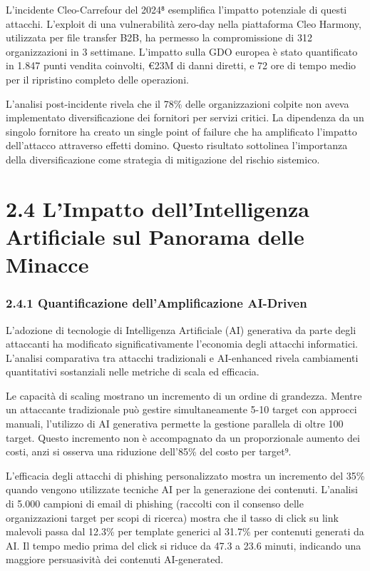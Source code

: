 \documentclass{report}
\begin{document}
L'incidente Cleo-Carrefour del 2024⁸ esemplifica l'impatto potenziale di
questi attacchi. L'exploit di una vulnerabilità zero-day nella
piattaforma Cleo Harmony, utilizzata per file transfer B2B, ha permesso
la compromissione di 312 organizzazioni in 3 settimane. L'impatto sulla
GDO europea è stato quantificato in 1.847 punti vendita coinvolti, €23M
di danni diretti, e 72 ore di tempo medio per il ripristino completo
delle operazioni.

L'analisi post-incidente rivela che il 78\% delle organizzazioni colpite
non aveva implementato diversificazione dei fornitori per servizi
critici. La dipendenza da un singolo fornitore ha creato un single point
of failure che ha amplificato l'impatto dell'attacco attraverso effetti
domino. Questo risultato sottolinea l'importanza della diversificazione
come strategia di mitigazione del rischio sistemico.

\section{2.4 L'Impatto dell'Intelligenza Artificiale sul Panorama
delle
Minacce}\label{limpatto-dellintelligenza-artificiale-sul-panorama-delle-minacce}

\subsubsection{2.4.1 Quantificazione dell'Amplificazione
AI-Driven}\label{quantificazione-dellamplificazione-ai-driven}

L'adozione di tecnologie di Intelligenza Artificiale (AI) generativa da
parte degli attaccanti ha modificato significativamente l'economia degli
attacchi informatici. L'analisi comparativa tra attacchi tradizionali e
AI-enhanced rivela cambiamenti quantitativi sostanziali nelle metriche
di scala ed efficacia.

Le capacità di scaling mostrano un incremento di un ordine di grandezza.
Mentre un attaccante tradizionale può gestire simultaneamente 5-10
target con approcci manuali, l'utilizzo di AI generativa permette la
gestione parallela di oltre 100 target. Questo incremento non è
accompagnato da un proporzionale aumento dei costi, anzi si osserva una
riduzione dell'85\% del costo per target⁹.

L'efficacia degli attacchi di phishing personalizzato mostra un
incremento del 35\% quando vengono utilizzate tecniche AI per la
generazione dei contenuti. L'analisi di 5.000 campioni di email di
phishing (raccolti con il consenso delle organizzazioni target per scopi
di ricerca) mostra che il tasso di click su link malevoli passa dal
12.3\% per template generici al 31.7\% per contenuti generati da AI. Il
tempo medio prima del click si riduce da 47.3 a 23.6 minuti, indicando
una maggiore persuasività dei contenuti AI-generated.
\end{document}

